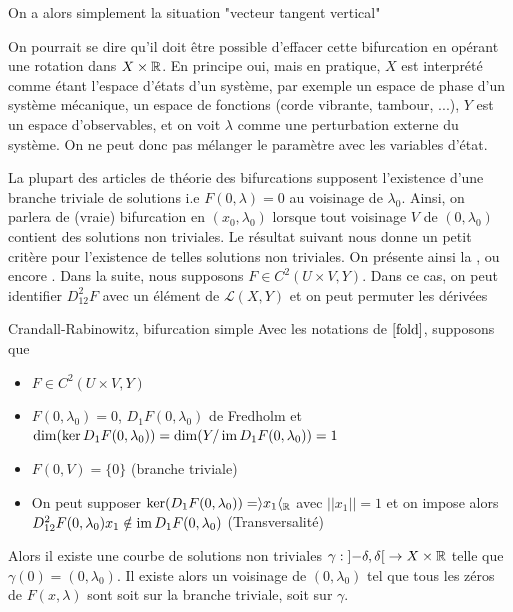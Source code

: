 \documentclass[memoire.tex]{subfiles}
\begin{document}
On a alors simplement la situation "vecteur tangent vertical"

\begin{remarque}
    On pourrait se dire qu'il doit être possible d'effacer cette bifurcation en opérant une rotation dans $X\times \mathbb{R}$. En principe oui, mais en pratique, $X$ est interprété comme étant l'espace d'états d'un système, par exemple un espace de phase d'un système mécanique, un espace de fonctions (corde vibrante, tambour, ...), $Y$ est un espace d'observables, et on voit $\lambda$ comme une perturbation externe du système. On ne peut donc pas mélanger le paramètre avec les variables d'état.
\end{remarque}
La plupart des articles de théorie des bifurcations supposent l'existence d'une branche triviale de solutions i.e $F(0,\lambda)=0$ au voisinage de $\lambda_0$. Ainsi, on parlera de (vraie) bifurcation en $(x_0,\lambda_0)$ lorsque tout voisinage $V$ de $(0,\lambda_0)$ contient des solutions non triviales.
Le résultat suivant nous donne un petit critère pour l'existence de telles solutions non triviales. On présente ainsi la , ou encore .
Dans la suite, nous supposons $F\in C^2(U\times V,Y)$. 
Dans ce cas, on peut identifier $D^2_{12} F$ avec un élément de $\mathcal{L}(X,Y)$ et on peut permuter les dérivées 
\begin{theobox}{Crandall-Rabinowitz, bifurcation simple}{} 
    Avec les notations de $\ref{fold}$, supposons que 
    \begin{itemize}
        \item $F\in C^2(U\times V,Y)$
        \item $F(0,\lambda_0)=0$, $D_1F(0,\lambda_0)$ de Fredholm et $\dim (\ker D_1F(0,\lambda_0))=\dim (Y/ \operatorname{im} D_1F(0,\lambda_0))=1$
        \item $F(0,V)=\{0\}$ (branche triviale)
        \item On peut supposer  $\ker(D_1 F(0,\lambda_0))=\rangle x_1 \langle_{\mathbb{R}} $ 
        avec $||x_1||=1$ et on impose alors \\ $D^2_{12} F(0,\lambda_0)x_1\notin \operatorname{im} D_1 F
        (0,\lambda_0)$ (Transversalité)
    \end{itemize}
    Alors il existe une courbe de solutions non triviales 
         $\gamma :\left] -\delta,\delta\right[ \rightarrow X\times\mathbb{R} $ telle que $\gamma(0)=(0,\lambda_0)$.
    Il existe alors un voisinage  de $(0,\lambda_0)$ tel que tous les zéros de $F(x,\lambda)$ sont  soit sur la branche triviale, soit sur $\gamma$. 
\end{theobox}
\end{document}
